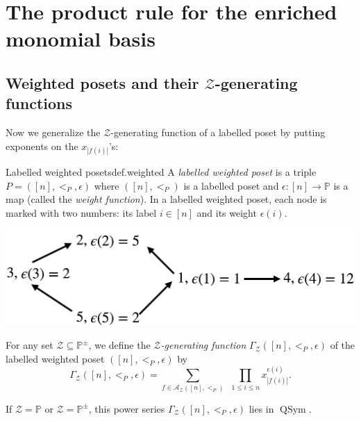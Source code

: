 \documentclass[numbers=enddot,12pt,final,onecolumn,notitlepage]{scrartcl}%
\newcommand{\PP}{\mathbb{P}} %
\newcommand{\QSym}{\operatorname{QSym}}
\newcommand{\calZ}{\mathcal{Z}}
\newcommand{\calA}{\mathcal{A}}
\newcommand{\defn}[1]{{\color{darkred}\emph{#1}}}
\newcommand{\0}{\phantom{c}}
\let\sumnonlimits\sum
\let\prodnonlimits\prod
\renewcommand{\sum}{\sumnonlimits\limits}
\renewcommand{\prod}{\prodnonlimits\limits}
\begin{document}
\section{The product rule for the enriched monomial basis}

\subsection{Weighted posets and their $\calZ$-generating functions}

Now we generalize the $\calZ$-generating function of a labelled poset by putting exponents on the $x_{|f(i)|}$'s:

\begin{definition}{Labelled weighted posets}{def.weighted}
A \defn{labelled weighted poset} is a triple $P = ([n], <_P, \epsilon)$ where $([n], <_P)$ is a labelled poset and $\epsilon : [n] \longrightarrow \PP$ is a map (called the \defn{weight function}).
In a labelled weighted poset, each node is marked with two numbers: its label $i \in [n]$ and its weight $\epsilon(i)$.
%
\begin{center}
 \includegraphics[scale=0.16]{Poset.png}
 \label{fig : poset}
 \end{center}
 For any set $\mathcal{Z}\subseteq \PP^{\pm}$, we define the \defn{$\calZ$-generating function} \defn{$\Gamma_\mathcal{Z}([n], <_P, \epsilon)$} of the labelled weighted poset $([n], <_P, \epsilon)$ by
\begin{equation}
\label{eq : weightGamma}
\Gamma_\mathcal{Z}([n], <_P, \epsilon) = \sum_{f \in \calA_\mathcal{Z}([n], <_P)}\ \ \prod_{1\leq i \leq n}x_{|f(i)|}^{\epsilon(i)} .
\end{equation}
\end{definition}

If $\calZ = \PP$ or $\calZ = \PP^{\pm}$, this power series $\Gamma_\mathcal{Z}([n], <_P, \epsilon)$ lies in $\QSym$.
\end{document}
